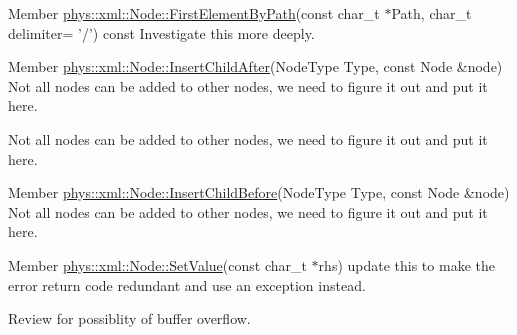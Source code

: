 \label{todo__todo000049}
\hypertarget{todo__todo000049}{}
 
\begin{DoxyDescription}
\item[Member \hyperlink{classphys_1_1xml_1_1Node_af2a9ac5c4e3252dca0e17720de093a9a}{phys::xml::Node::FirstElementByPath}(const char\_\-t $\ast$Path, char\_\-t delimiter= '/') const  ]Investigate this more deeply. 
\end{DoxyDescription}

\label{todo__todo000047}
\hypertarget{todo__todo000047}{}
 
\begin{DoxyDescription}
\item[Member \hyperlink{classphys_1_1xml_1_1Node_affc4d9cc0ea7c89bac58d91a432af2ef}{phys::xml::Node::InsertChildAfter}(NodeType Type, const Node \&node) ]Not all nodes can be added to other nodes, we need to figure it out and put it here. 

Not all nodes can be added to other nodes, we need to figure it out and put it here. 
\end{DoxyDescription}

\label{todo__todo000041}
\hypertarget{todo__todo000041}{}
 
\begin{DoxyDescription}
\item[Member \hyperlink{classphys_1_1xml_1_1Node_a691684896ab5d29a634415e745aaec7a}{phys::xml::Node::InsertChildBefore}(NodeType Type, const Node \&node) ]Not all nodes can be added to other nodes, we need to figure it out and put it here. 
\end{DoxyDescription}

\label{todo__todo000039}
\hypertarget{todo__todo000039}{}
 
\begin{DoxyDescription}
\item[Member \hyperlink{classphys_1_1xml_1_1Node_a50ff9948dac721339561ed3442fb7034}{phys::xml::Node::SetValue}(const char\_\-t $\ast$rhs) ]update this to make the error return code redundant and use an exception instead. 

Review for possiblity of buffer overflow. 
\end{DoxyDescription}